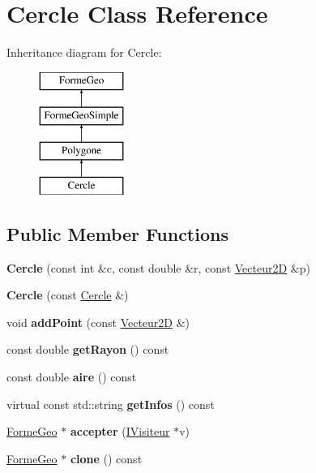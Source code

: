 \hypertarget{class_cercle}{}\section{Cercle Class Reference}
\label{class_cercle}
Inheritance diagram for Cercle\+:\begin{figure}[H]
\begin{center}
\leavevmode
\includegraphics[height=4.000000cm]{d1/d42/class_cercle}
\end{center}
\end{figure}
\subsection*{Public Member Functions}
\begin{DoxyCompactItemize}
\item 
\mbox{\label{class_cercle_a83cec05702e654f1b12751affc68eed4}} 
{\bfseries Cercle} (const int \&c, const double \&r, const \mbox{\hyperlink{class_vecteur2_d}{Vecteur2D}} \&p)
\item 
\mbox{\label{class_cercle_a1c5cab1b168ab2b4476ff5efdd8229e0}} 
{\bfseries Cercle} (const \mbox{\hyperlink{class_cercle}{Cercle}} \&)
\item 
\mbox{\label{class_cercle_a698984718099a525cd077b312adc28d5}} 
void {\bfseries add\+Point} (const \mbox{\hyperlink{class_vecteur2_d}{Vecteur2D}} \&)
\item 
\mbox{\label{class_cercle_a34bd2ea2ada0f6ded69c0f22e4c02aed}} 
const double {\bfseries get\+Rayon} () const
\item 
\mbox{\label{class_cercle_ae6393bd0c80c564664d7cdcdddd4e30b}} 
const double {\bfseries aire} () const
\item 
\mbox{\label{class_cercle_ac95ea9f18a256170a62c6de366f46206}} 
virtual const std\+::string {\bfseries get\+Infos} () const
\item 
\mbox{\label{class_cercle_a26e3624eade16ec068c27a8c390a4d00}} 
\mbox{\hyperlink{class_forme_geo}{Forme\+Geo}} $\ast$ {\bfseries accepter} (\mbox{\hyperlink{class_i_visiteur}{I\+Visiteur}} $\ast$v)
\item 
\mbox{\label{class_cercle_adcf01c83049da6673cb2e1298dfce16a}} 
\mbox{\hyperlink{class_forme_geo}{Forme\+Geo}} $\ast$ {\bfseries clone} () const
\end{DoxyCompactItemize}
